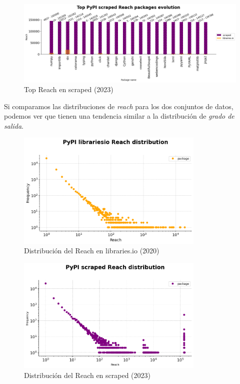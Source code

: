 \begin{figure}[h!]
    \begin{center}
        \includegraphics[width=1\textwidth]{img/pypi/top_scraped_reach_evolution.png}
        \caption{Top Reach en scraped (2023)}
    \end{center}
\end{figure}


Si comparamos las distribuciones de \textit{reach} para los dos conjuntos de datos, podemos ver que tienen una
tendencia similar a la distribución de \textit{grado de salida}.

\begin{figure}[h!]
    \begin{center}
        \includegraphics[width=0.8\textwidth]{img/pypi/librariesio_reach_distribution.png}
        \caption{Distribución del Reach en libraries.io (2020)}
    \end{center}
\end{figure}

\begin{figure}[h!]
    \begin{center}
        \includegraphics[width=0.8\textwidth]{img/pypi/scraped_reach_distribution.png}
        \caption{Distribución del Reach en scraped (2023)}
    \end{center}
\end{figure}

